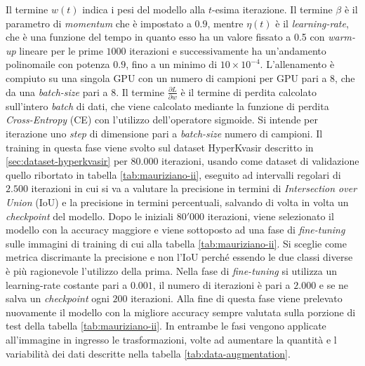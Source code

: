 Il termine $w(t)$ indica i pesi del modello alla $t$-esima
iterazione.
Il termine $\beta$ è il parametro di {\it momentum} che
è impostato a $0.9$, mentre $\eta(t)$ è il {\it learning-rate},
che è una funzione del tempo in quanto esso ha un valore 
fissato a 0.5 con {\it warm-up} lineare per le prime $1000$
iterazioni e successivamente ha un'andamento polinomaile
con potenza $0.9$, fino a un minimo di $10\times 10^{-4}$.
L'allenamento è compiuto su una singola GPU con un numero
di campioni per GPU pari a 8, che da una {\it batch-size}
pari a 8.
Il termine $\displaystyle \frac{\partial L}{\partial w}$ è
il termine di perdita calcolato sull'intero {\it batch} di
dati, che viene calcolato mediante la funzione di perdita
{\it Cross-Entropy} (CE) con l'utilizzo dell'operatore
sigmoide.
Si intende per iterazione uno {\it step} di dimensione
pari a {\it batch-size} numero di campioni.
Il training in questa fase viene svolto sul dataset HyperKvasir
descritto in \ref{sec:dataset-hyperkvasir} per $80.000$ iterazioni,
usando come dataset di validazione quello ribortato in tabella
\ref{tab:mauriziano-ii}, eseguito ad intervalli regolari di
$2.500$ iterazioni in cui si va a valutare la precisione
in termini di {\it Intersection over Union} (IoU) e
la precisione in termini percentuali, salvando
di volta in volta un {\it checkpoint} del modello.
Dopo le iniziali $80'000$ iterazioni, viene selezionato
il modello con la accuracy maggiore e viene sottoposto
ad una fase di {\it fine-tuning} sulle immagini di
training di cui alla tabella \ref{tab:mauriziano-ii}.
Si sceglie come metrica discrimante la precisione e non
l'IoU perché essendo le due classi diverse è più
ragionevole l'utilizzo della prima.
Nella fase di {\it fine-tuning} si utilizza un learning-rate
costante pari a $0.001$, il numero di iterazioni è pari a
$2.000$ e se ne salva un {\it checkpoint} ogni $200$ iterazioni.
Alla fine di questa fase viene prelevato nuovamente il modello
con la migliore accuracy sempre valutata sulla porzione di test
della tabella \ref{tab:mauriziano-ii}.
In entrambe le fasi vengono applicate all'immagine in ingresso
le trasformazioni, volte ad aumentare la quantità e l
variabilità dei dati descritte nella tabella
\ref{tab:data-augmentation}.

